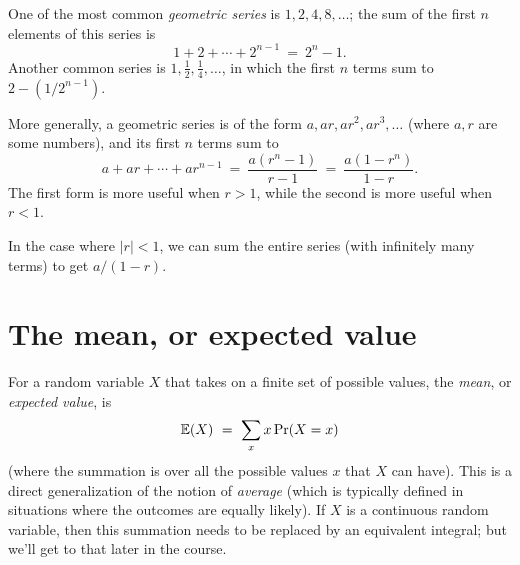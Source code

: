 One of the most common {\it geometric series} is $1, 2, 4, 8, \ldots$; the sum
of the first $n$ elements of this series is
$$ 1 + 2 + \cdots + 2^{n-1} \ = \ 2^n - 1 .$$
Another common series is $1, \frac{1}{2}, \frac{1}{4}, \ldots$,
in which the first $n$ terms sum to $2 - (1/2^{n-1})$.

More generally, a geometric series is of the form $a, ar, ar^2, ar^3, \ldots$
(where $a,r$ are some numbers), and its first $n$ terms sum to
$$ a + ar + \cdots + ar^{n-1} 
\ = \ 
\frac{a(r^n-1)}{r-1}
\ = \ 
\frac{a(1-r^n)}{1-r}.$$
The first form is more useful when $r > 1$, while the second is more useful when $r< 1$.

In the case where $|r| < 1$, we can sum the entire series (with infinitely many terms) 
to get $a/(1-r)$.

\section{The mean, or expected value}

For a random variable $X$ that takes on a finite set of possible values, the 
{\it mean}, or {\it expected value}, is
$$ \mathbb{E}(X) \ = \ \sum_{x} x \, \mbox{\rm Pr}(X = x) $$
(where the summation is over all the possible values $x$ that $X$ can have). This
is a direct generalization of the notion of {\it average} (which is typically
defined in situations where the outcomes are equally likely). If $X$ is a continuous 
random variable, then this summation needs to be replaced by an equivalent integral; 
but we'll get to that later in the course.

